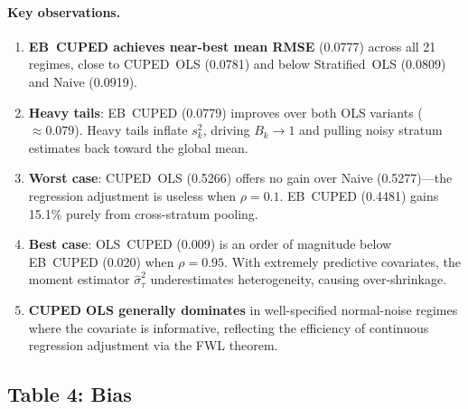 \documentclass[11pt,letterpaper]{article}
\newcommand{\sigmahat}{\hat{\sigma}}
\begin{document}
\paragraph{Key observations.}
\begin{enumerate}[label=(\roman*)]
  \item \textbf{EB~CUPED achieves near-best mean RMSE} (0.0777) across all 21
    regimes, close to CUPED~OLS (0.0781) and below Stratified~OLS
    (0.0809) and Naive (0.0919).
  \item \textbf{Heavy tails}: EB~CUPED (0.0779) improves over both OLS
    variants ($\approx 0.079$).  Heavy tails inflate $s_k^2$,
    driving $B_k \to 1$ and pulling noisy stratum estimates back toward
    the global mean.
  \item \textbf{Worst case}: CUPED~OLS (0.5266) offers no gain over
    Naive (0.5277)---the regression adjustment is useless when $\rho = 0.1$.
    EB~CUPED (0.4481) gains 15.1\% purely from cross-stratum pooling.
  \item \textbf{Best case}: OLS~CUPED (0.009) is an order of magnitude
    below EB~CUPED (0.020) when $\rho = 0.95$.  With extremely
    predictive covariates, the moment estimator $\sigmahat_\tau^2$
    underestimates heterogeneity, causing over-shrinkage.
  \item \textbf{CUPED OLS generally dominates} in well-specified normal-noise
    regimes where the covariate is informative, reflecting the
    efficiency of continuous regression adjustment via the FWL theorem.
\end{enumerate}


\subsection{Table 4: Bias}
\end{document}
